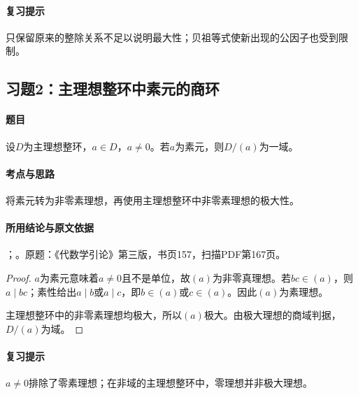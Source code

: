 \paragraph{复习提示}

只保留原来的整除关系不足以说明最大性；贝祖等式使新出现的公因子也受到限制。

\subsection{习题2：主理想整环中素元的商环}

\label{ex:4:2}

\paragraph{题目}

设$D$为主理想整环，$a\in D$，$a\ne0$。若$a$为素元，则$D/(a)$为一域。

\paragraph{考点与思路}

将素元转为非零素理想，再使用主理想整环中非零素理想的极大性。

\paragraph{所用结论与原文依据}

；。原题：《代数学引论》第三版，书页157，扫描PDF第167页。


\begin{proof}

$a$为素元意味着$a\ne0$且不是单位，故$(a)$为非零真理想。若$bc\in(a)$，则$a\mid bc$；素性给出$a\mid b$或$a\mid c$，即$b\in(a)$或$c\in(a)$。因此$(a)$为素理想。

主理想整环中的非零素理想均极大，所以$(a)$极大。由极大理想的商域判据，$D/(a)$为域。

\end{proof}

\paragraph{复习提示}

$a\ne0$排除了零素理想；在非域的主理想整环中，零理想并非极大理想。

